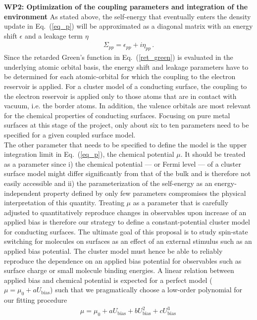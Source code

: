 \documentclass[a4paper,11pt,headings=normal]{scrartcl}
\begin{document}
\noindent
\textbf{WP2: Optimization of the coupling parameters and integration of the environment} 
As stated above, the self-energy that eventually enters the density update in Eq.~(\ref{eq_p}) will be approximated as a diagonal matrix with an energy shift $\epsilon$ and a leakage term $\eta$
\begin{align}
\Sigma_{pp} = \epsilon_{pp} + i \eta_{pp} \, .
\label{self_en}
\end{align}
Since the retarded Green's function in Eq.~(\ref{ret_green}) is evaluated in the underlying atomic orbital basis, the energy shift and leakage parameters have to be determined for each atomic-orbital for which the coupling to the electron reservoir is applied.
For a cluster model of a conducting surface, the coupling to the electron reservoir is applied only to those atoms that are in contact with vacuum, i.e. the border atoms. In addition, the valence orbitals are most relevant for the chemical properties of conducting surfaces. Focusing on pure metal surfaces at this stage of the project, only about six to ten parameters need to be specified for a given coupled surface model. \\
The other parameter that needs to be specified to define the model is the upper integration limit in Eq.~(\ref{eq_p}), the chemical potential $\mu$. It should be treated as a parameter since i) the chemical potential --- or Fermi level --- of a cluster surface model might differ significantly from that of the bulk and is therefore not easily accessible and ii) the parameterization of the self-energy as an energy-independent property defined by only few parameters compromises the physical interpretation of this quantity. Treating $\mu$ as a parameter that is carefully adjusted to quantitatively reproduce changes in observables upon increase of an applied bias is therefore our strategy to define a constant-potential cluster model for conducting surfaces. The ultimate goal of this proposal is to study spin-state switching for molecules on surfaces as an effect of an external stimulus such as an applied bias potential. The cluster model must hence be able to reliably reproduce the dependence on an applied bias potential for observables such as surface charge or small molecule binding energies. A linear relation between applied bias and chemical potential is expected for a perfect model ($\mu=\mu_0+a U_\text{bias}$) such that we pragmatically choose a low-order polynomial for our fitting procedure
\begin{align}
\mu=\mu_0+a U_\text{bias}+ b U_\text{bias}^2+ c U_\text{bias}^3 \, 
\end{align}
\end{document}
